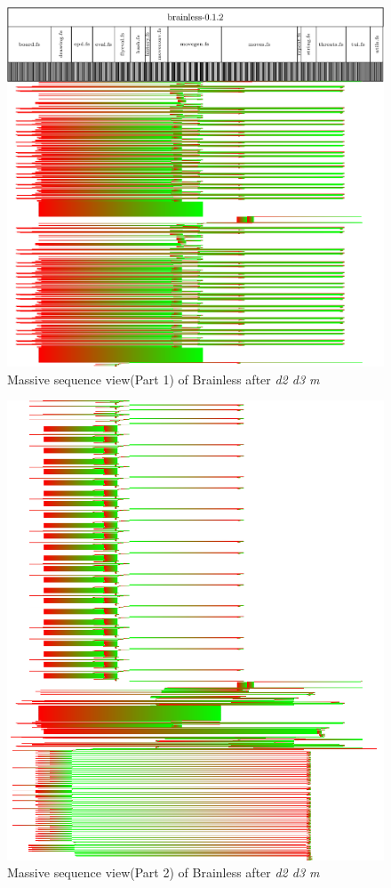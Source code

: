 \begin{figure}[p]
    \centering
    \includegraphics[scale=0.52]{graphics/massive_sequence_view-dir_file_word_1.png}
    \caption{Massive sequence view(Part 1) of Brainless after \emph{d2 d3 m}}
    \label{fig:massive_sequence_view_1}
\end{figure}

\begin{figure}[p]
    \centering
    \includegraphics[scale=0.52]{graphics/massive_sequence_view-dir_file_word_2.png}
    \caption{Massive sequence view(Part 2) of Brainless after \emph{d2 d3 m}}
    \label{fig:massive_sequence_view_2}
\end{figure}

